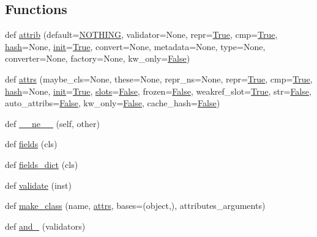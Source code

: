 \subsection*{Functions}
\begin{DoxyCompactItemize}
\item 
def \hyperlink{namespaceattr_1_1__make_aea3159bafb6597ea00ed372a8e07b769}{attrib} (default=\hyperlink{namespaceattr_1_1__make_a4b0e597eb2f1bb453e7502bf9e1ec615}{N\+O\+T\+H\+I\+NG}, validator=None, repr=\hyperlink{namespaceattr_1_1__make_a2574ed57c67459b7e6bcc4e40da338f3}{True}, cmp=\hyperlink{namespaceattr_1_1__make_a2574ed57c67459b7e6bcc4e40da338f3}{True}, \hyperlink{namespaceattr_1_1__make_a669b2aad68738f520370d3236455673b}{hash}=None, \hyperlink{namespaceattr_1_1__make_afb414d36bf2a925437c74a78ed53b431}{init}=\hyperlink{namespaceattr_1_1__make_a2574ed57c67459b7e6bcc4e40da338f3}{True}, convert=None, metadata=None, type=None, converter=None, factory=None, kw\+\_\+only=\hyperlink{namespaceattr_1_1__make_a65fcd916433aa9a30f9711503366982e}{False})
\item 
def \hyperlink{namespaceattr_1_1__make_a22b2d1a5d34bb559ff4b782430408411}{attrs} (maybe\+\_\+cls=None, these=None, repr\+\_\+ns=None, repr=\hyperlink{namespaceattr_1_1__make_a2574ed57c67459b7e6bcc4e40da338f3}{True}, cmp=\hyperlink{namespaceattr_1_1__make_a2574ed57c67459b7e6bcc4e40da338f3}{True}, \hyperlink{namespaceattr_1_1__make_a669b2aad68738f520370d3236455673b}{hash}=None, \hyperlink{namespaceattr_1_1__make_afb414d36bf2a925437c74a78ed53b431}{init}=\hyperlink{namespaceattr_1_1__make_a2574ed57c67459b7e6bcc4e40da338f3}{True}, \hyperlink{namespaceattr_1_1__make_a3179af049217b622fd43d09b50f2d6fb}{slots}=\hyperlink{namespaceattr_1_1__make_a65fcd916433aa9a30f9711503366982e}{False}, frozen=\hyperlink{namespaceattr_1_1__make_a65fcd916433aa9a30f9711503366982e}{False}, weakref\+\_\+slot=\hyperlink{namespaceattr_1_1__make_a2574ed57c67459b7e6bcc4e40da338f3}{True}, str=\hyperlink{namespaceattr_1_1__make_a65fcd916433aa9a30f9711503366982e}{False}, auto\+\_\+attribs=\hyperlink{namespaceattr_1_1__make_a65fcd916433aa9a30f9711503366982e}{False}, kw\+\_\+only=\hyperlink{namespaceattr_1_1__make_a65fcd916433aa9a30f9711503366982e}{False}, cache\+\_\+hash=\hyperlink{namespaceattr_1_1__make_a65fcd916433aa9a30f9711503366982e}{False})
\item 
def \hyperlink{namespaceattr_1_1__make_ac708a1f410f2045b7e529df589a9d845}{\+\_\+\+\_\+ne\+\_\+\+\_\+} (self, other)
\item 
def \hyperlink{namespaceattr_1_1__make_a357e306d8a24fb39dbeebe59d704d352}{fields} (cls)
\item 
def \hyperlink{namespaceattr_1_1__make_a5aaa5f8707fabad43bfc9c4e13d06198}{fields\+\_\+dict} (cls)
\item 
def \hyperlink{namespaceattr_1_1__make_ae0977efca96d32ec875de623eb6887c3}{validate} (inst)
\item 
def \hyperlink{namespaceattr_1_1__make_a9d60a5278881d72a5c8fc0bd59cf43db}{make\+\_\+class} (name, \hyperlink{namespaceattr_1_1__make_a22b2d1a5d34bb559ff4b782430408411}{attrs}, bases=(object,), attributes\+\_\+arguments)
\item 
def \hyperlink{namespaceattr_1_1__make_a2d73711c774cd3afcd815955c895c654}{and\+\_\+} (validators)
\end{DoxyCompactItemize}
